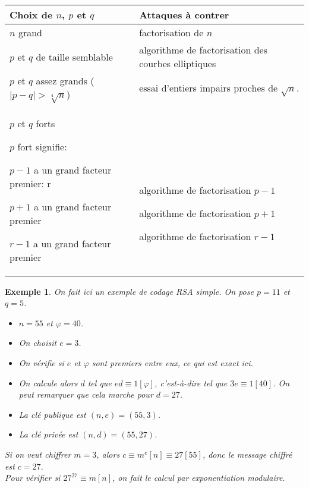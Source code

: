 \documentclass[12pt]{report}
\newtheorem*{ex}{Exemple}
\begin{document}
\begin{tabular}{p{6cm}|p{6cm}}
{Choix de $n$, $p$ et $q$}  & Attaques à contrer \\
\hline 
$n$ grand & factorisation de $n$ \\
\hline
$p$ et $q$ de taille semblable  & algorithme de factorisation des courbes elliptiques \\
\hline
$p$ et $q$ assez grands ($|p-q|> \sqrt[4]{n} $) & essai d'entiers impairs proches de $\sqrt{n}$. \\
\hline
$p$ et $q$ forts

$p$ fort signifie:

$p-1$ a un grand facteur premier: r

$p+1$ a un grand facteur premier

$r-1$ a un grand facteur premier

 & \
 
 \
 
 algorithme de factorisation $p-1$
 
 algorithme de factorisation $p+1$
 
  algorithme de factorisation $r-1$ 
 
 
 \\

\end{tabular}

\begin{ex}
On fait ici un exemple de codage RSA simple. On pose $p=11$ et $q=5$.
\begin{itemize}
\item[$1.$] $n=55$ et $\varphi=40$.
\item[$2.$] On choisit $e=3$.
\item[$3.$] On vérifie si $e$ et $\varphi$ sont premiers entre eux, ce qui est exact ici.
\item[$4.$] On calcule alors $d$ tel que $ed \equiv 1 [\varphi]$, c'est-à-dire tel que $3e \equiv 1[40]$. On peut remarquer que cela marche pour $d=27$.
\item[$5.$] La clé publique est $(n,e)=(55,3)$.
\item[$6.$] La clé privée est $(n,d)=(55,27)$. 
\end{itemize}
Si on veut chiffrer $m=3$, alors $c \equiv m^e[n] \equiv 27 [55]$, donc le message chiffré est $c=27$.\\
Pour vérifier si $27^{27} \equiv m [n]$, on fait le calcul par exponentiation modulaire.
\end{ex}
\end{document}
